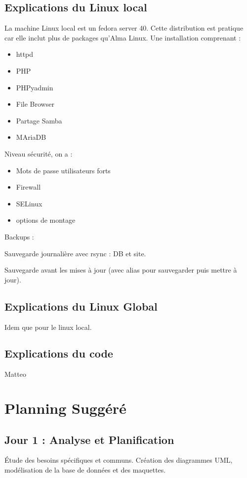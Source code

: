 \documentclass[a4paper,12pt]{report}
\begin{document}
\section{Explications du Linux local}

La machine Linux local est un fedora server 40. 
Cette distribution est pratique car elle inclut plus de packages qu'Alma Linux.
Une installation comprenant :

\begin{itemize}
\item httpd
\item PHP
\item PHPyadmin
\item File Browser
\item Partage Samba
\item MAriaDB
\end{itemize}

Niveau sécurité, on a :
\begin{itemize}
\item Mots de passe utilisateurs forts 
\item Firewall
\item SELinux
\item options de montage 
\end{itemize}

Backups : 

Sauvegarde journalière avec rsync : DB et site.

Sauvegarde avant les mises à jour (avec alias pour sauvegarder puis mettre à jour).

\section{Explications du Linux Global}

Idem que pour le linux local.

\section{Explications du code}

Matteo

\chapter{Planning Suggéré}
\section{Jour 1 : Analyse et Planification}
Étude des besoins spécifiques et communs. Création des diagrammes UML, modélisation de la base de données et des maquettes.
\end{document}
